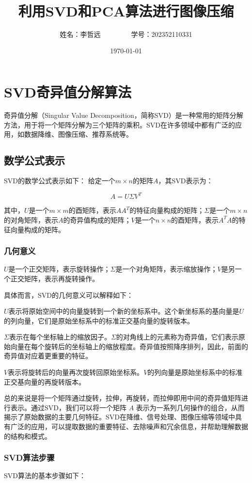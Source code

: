 \documentclass[UTF8]{ctexart}
\title{利用SVD和PCA算法进行图像压缩}
\author{姓名：李哲远~~~~~~~~~学号：202352110331}
\date{\today}
\begin{document}
\maketitle

\section{SVD奇异值分解算法}
奇异值分解（Singular Value Decomposition，简称SVD）是一种常用的矩阵分解方法，用于将一个矩阵分解为三个矩阵的乘积。SVD在许多领域中都有广泛的应用，如数据降维、图像压缩、推荐系统等。

\subsection{数学公式表示}
SVD的数学公式表示如下：
给定一个$m \times n$的矩阵$A$，其SVD表示为：

\[
A = U \Sigma V^T
\]

其中，$U$是一个$m \times m$的酉矩阵，表示$AA^T$的特征向量构成的矩阵；$\Sigma$是一个$m \times n$的对角矩阵，表示$A$的奇异值构成的矩阵；$V$是一个$n \times n$的酉矩阵，表示$A^TA$的特征向量构成的矩阵。

\subsubsection{几何意义}


$U$是一个正交矩阵，表示旋转操作；$\Sigma$是一个对角矩阵，表示缩放操作；$V$是另一个正交矩阵，表示再旋转操作。

具体而言，SVD的几何意义可以解释如下：

$U$表示将原始空间中的向量旋转到一个新的坐标系中。这个新坐标系的基向量是$U$的列向量，它们是原始坐标系中的标准正交基向量的旋转版本。

$\Sigma$表示在每个坐标轴上的缩放因子。$\Sigma$的对角线上的元素称为奇异值，它们表示原始向量在每个旋转后的坐标轴上的缩放程度。奇异值按照降序排列，因此，前面的奇异值对应着更重要的特征。

$V$表示将旋转后的向量再次旋转回原始坐标系。$V$的列向量是原始坐标系中的标准正交基向量的再旋转版本。

总的来说是将一个矩阵通过旋转，拉伸，再旋转，而拉伸即用中间的奇异值矩阵进行表示。通过SVD，我们可以将一个矩阵 $A$ 表示为一系列几何操作的组合，从而揭示了原始数据的主要几何特征。SVD在降维、信号处理、图像压缩等领域中具有广泛的应用，可以提取数据的重要特征、去除噪声和冗余信息，并帮助理解数据的结构和模式。

\subsubsection{SVD算法步骤}
SVD算法的基本步骤如下：
\end{document}
